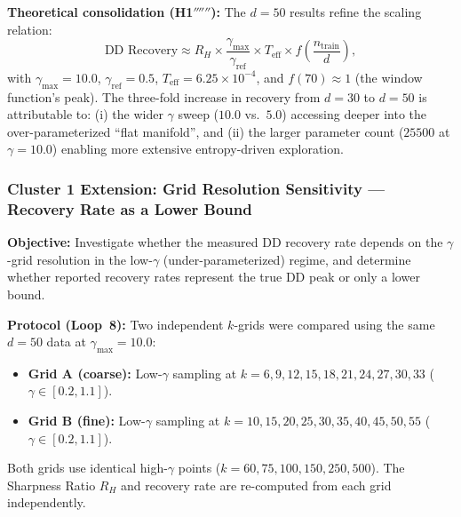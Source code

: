 \documentclass[
  journal=largetwo,
  simfonts=false,
  year=2025,
  volume=37,
]{cup-journal}
\begin{document}
\textbf{Theoretical consolidation (H1$''''''$):} The $d=50$ results refine the scaling relation:
\[
\text{DD Recovery} \approx R_H \times \frac{\gamma_{\max}}{\gamma_{\mathrm{ref}}} \times T_{\mathrm{eff}} \times f\!\left(\frac{n_{\mathrm{train}}}{d}\right),
\]
with $\gamma_{\max}=10.0$, $\gamma_{\mathrm{ref}}=0.5$, $T_{\mathrm{eff}}=6.25\times 10^{-4}$, and $f(70) \approx 1$ (the window function's peak). The three-fold increase in recovery from $d=30$ to $d=50$ is attributable to: (i) the wider $\gamma$ sweep ($10.0$ vs.\ $5.0$) accessing deeper into the over-parameterized ``flat manifold'', and (ii) the larger parameter count ($25500$ at $\gamma=10.0$) enabling more extensive entropy-driven exploration.

\subsubsection{Cluster 1 Extension: Grid Resolution Sensitivity --- Recovery Rate as a Lower Bound}\label{sec:grid_sensitivity}

\textbf{Objective:} Investigate whether the measured DD recovery rate depends on the $\gamma$-grid resolution in the low-$\gamma$ (under-parameterized) regime, and determine whether reported recovery rates represent the true DD peak or only a lower bound.

\textbf{Protocol (Loop~8):} Two independent $k$-grids were compared using the same $d=50$ data at $\gamma_{\max}=10.0$:
\begin{itemize}
    \item \textbf{Grid A (coarse):} Low-$\gamma$ sampling at $k = 6, 9, 12, 15, 18, 21, 24, 27, 30, 33$ ($\gamma \in [0.2, 1.1]$).
    \item \textbf{Grid B (fine):} Low-$\gamma$ sampling at $k = 10, 15, 20, 25, 30, 35, 40, 45, 50, 55$ ($\gamma \in [0.2, 1.1]$).
\end{itemize}
Both grids use identical high-$\gamma$ points ($k = 60, 75, 100, 150, 250, 500$). The Sharpness Ratio $R_H$ and recovery rate are re-computed from each grid independently.
\end{document}
